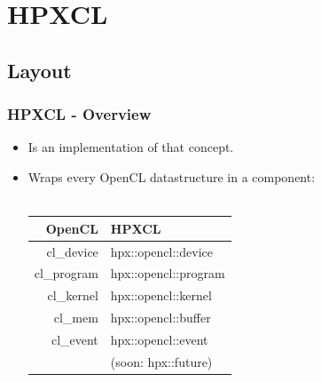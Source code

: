 \documentclass{beamer}
\begin{document}
\section{HPXCL}
\subsection{Layout}
\begin{frame}
    \frametitle{HPXCL - Overview}
    \begin{itemize}
        \item Is an implementation of that concept.
        \item Wraps every OpenCL datastructure in a component:
            \\~\\
            \begin{tabular}{ r || l }
                OpenCL       & HPXCL                \\
                \hline
                cl\_device   & hpx::opencl::device  \\
                cl\_program  & hpx::opencl::program \\
                cl\_kernel   & hpx::opencl::kernel  \\
                cl\_mem      & hpx::opencl::buffer  \\
                cl\_event    & hpx::opencl::event   \\
                ~            & (soon: hpx::future)  \\
            \end{tabular}
    \end{itemize}
\end{frame}

\end{document}
